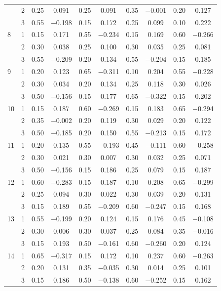 \begin{longtable}{llcccccccc}
   & 2 & 0.25 & 0.091 & 0.25 & 0.091 & 0.35 & $-$0.001 & 0.20 & 0.127 \\ 
   & 3 & 0.55 & $-$0.198 & 0.15 & 0.172 & 0.25 & 0.099 & 0.10 & 0.222 \\ 
  8 & 1 & 0.15 & 0.171 & 0.55 & $-$0.234 & 0.15 & 0.169 & 0.60 & $-$0.266 \\ 
   & 2 & 0.30 & 0.038 & 0.25 & 0.100 & 0.30 & 0.035 & 0.25 & 0.081 \\ 
   & 3 & 0.55 & $-$0.209 & 0.20 & 0.134 & 0.55 & $-$0.204 & 0.15 & 0.185 \\ 
  9 & 1 & 0.20 & 0.123 & 0.65 & $-$0.311 & 0.10 & 0.204 & 0.55 & $-$0.228 \\ 
   & 2 & 0.30 & 0.034 & 0.20 & 0.134 & 0.25 & 0.118 & 0.30 & 0.026 \\ 
   & 3 & 0.50 & $-$0.156 & 0.15 & 0.177 & 0.65 & $-$0.322 & 0.15 & 0.202 \\ 
  10 & 1 & 0.15 & 0.187 & 0.60 & $-$0.269 & 0.15 & 0.183 & 0.65 & $-$0.294 \\ 
   & 2 & 0.35 & $-$0.002 & 0.20 & 0.119 & 0.30 & 0.029 & 0.20 & 0.122 \\ 
   & 3 & 0.50 & $-$0.185 & 0.20 & 0.150 & 0.55 & $-$0.213 & 0.15 & 0.172 \\ 
  11 & 1 & 0.20 & 0.135 & 0.55 & $-$0.193 & 0.45 & $-$0.111 & 0.60 & $-$0.258 \\ 
   & 2 & 0.30 & 0.021 & 0.30 & 0.007 & 0.30 & 0.032 & 0.25 & 0.071 \\ 
   & 3 & 0.50 & $-$0.156 & 0.15 & 0.186 & 0.25 & 0.079 & 0.15 & 0.187 \\ 
  12 & 1 & 0.60 & $-$0.283 & 0.15 & 0.187 & 0.10 & 0.208 & 0.65 & $-$0.299 \\ 
   & 2 & 0.25 & 0.094 & 0.30 & 0.022 & 0.30 & 0.039 & 0.20 & 0.131 \\ 
   & 3 & 0.15 & 0.189 & 0.55 & $-$0.209 & 0.60 & $-$0.247 & 0.15 & 0.168 \\ 
  13 & 1 & 0.55 & $-$0.199 & 0.20 & 0.124 & 0.15 & 0.176 & 0.45 & $-$0.108 \\ 
   & 2 & 0.30 & 0.006 & 0.30 & 0.037 & 0.25 & 0.084 & 0.35 & $-$0.016 \\ 
   & 3 & 0.15 & 0.193 & 0.50 & $-$0.161 & 0.60 & $-$0.260 & 0.20 & 0.124 \\ 
  14 & 1 & 0.65 & $-$0.317 & 0.15 & 0.172 & 0.10 & 0.237 & 0.60 & $-$0.263 \\ 
   & 2 & 0.20 & 0.131 & 0.35 & $-$0.035 & 0.30 & 0.014 & 0.25 & 0.101 \\ 
   & 3 & 0.15 & 0.186 & 0.50 & $-$0.138 & 0.60 & $-$0.252 & 0.15 & 0.162 \\ 

\end{longtable}

